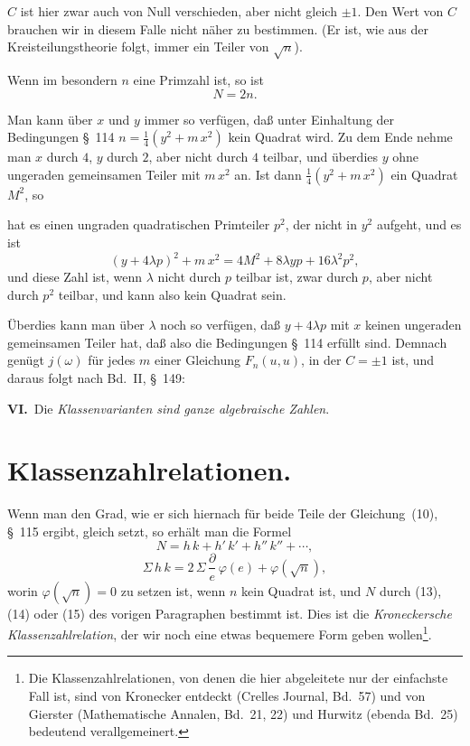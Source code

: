 \documentclass[12pt,a4paper]{article}
\theoremstyle{weber}
\begin{document}
$C$ ist hier zwar auch von Null verschieden, aber nicht gleich $\pm 1$. Den Wert von $C$ brauchen wir in diesem Falle nicht näher zu bestimmen. (Er ist, wie aus der Kreisteilungstheorie folgt, immer ein Teiler von $\sqrt{n}$).

Wenn im besondern $n$ eine Primzahl ist, so ist
\begin{equation}
N = 2n.
\end{equation}

Man kann über $x$ und $y$ immer so verfügen, daß unter Einhaltung der Bedingungen \S~114 $n = \tfrac{1}{4}(y^2 + m\,x^2)$ kein Quadrat wird. Zu dem Ende nehme man $x$ durch $4$, $y$ durch $2$, aber nicht durch $4$ teilbar, und überdies $y$ ohne ungeraden gemeinsamen Teiler mit $m\,x^2$ an. Ist dann $\tfrac{1}{4}(y^2 + m\,x^2)$ ein Quadrat $M^2$, so

\newpage

hat es einen ungraden quadratischen Primteiler $p^2$, der nicht in $y^2$ aufgeht, und es ist
\[
(y + 4\lambda p)^2 + m\,x^2 = 4M^2 + 8\lambda y p + 16\lambda^2 p^2,
\]
und diese Zahl ist, wenn $\lambda$ nicht durch $p$ teilbar ist, zwar durch $p$, aber nicht durch $p^2$ teilbar, und kann also kein Quadrat sein.

Überdies kann man über $\lambda$ noch so verfügen, daß $y + 4\lambda p$ mit $x$ keinen ungeraden gemeinsamen Teiler hat, daß also die Bedingungen \S~114 erfüllt sind. Demnach genügt $j(\omega)$ für jedes $m$ einer Gleichung $F_n(u, u)$, in der $C = \pm 1$ ist, und daraus folgt nach Bd.~II, \S~149:

\medskip
\textbf{VI.}\ Die \textit{Klassenvarianten sind ganze algebraische Zahlen}.

\newpage
\section{Klassenzahlrelationen.}

Wenn man den Grad, wie er sich hiernach für beide Teile der Gleichung~(10), \S~115 ergibt, gleich setzt, so erhält man die Formel
\begin{equation}
N = h\,k + h'\,k' + h''\,k'' + \cdots,
\end{equation}
\begin{equation}
\Sigma\,h\,k = 2\,\Sigma\,\frac{\partial}{e}\,\varphi(e) + \varphi(\sqrt{n}),
\end{equation}
worin $\varphi(\sqrt{n}) = 0$ zu setzen ist, wenn $n$ kein Quadrat ist, und $N$ durch (13), (14) oder (15) des vorigen Paragraphen bestimmt ist. Dies ist die \textit{Kroneckersche Klassenzahlrelation}, der wir noch eine etwas bequemere Form geben wollen\footnote{Die Klassenzahlrelationen, von denen die hier abgeleitete nur der einfachste Fall ist, sind von Kronecker entdeckt (Crelles Journal, Bd.~57) und von Gierster (Mathematische Annalen, Bd.~21, 22) und Hurwitz (ebenda Bd.~25) bedeutend verallgemeinert.}.
\end{document}

